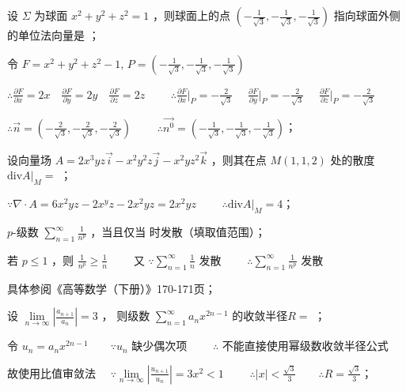 \begin{question}[points = 3]
    设 $\Sigma$ 为球面 $x^2 + y^2 + z^2 = 1$ ，则球面上的点 $\left(-\frac{1}{\sqrt{3}}, -\frac{1}{\sqrt{3}}, -\frac{1}{\sqrt{3}}\right)$
    指向球面外侧的单位法向量是 ；
\end{question}
\begin{solution}
    令 $F = x^2 + y^2 + z^2 - 1, \, P = \left(-\frac{1}{\sqrt{3}}, -\frac{1}{\sqrt{3}}, -\frac{1}{\sqrt{3}}\right)$

    $\therefore \frac{\partial F}{\partial x} = 2x \quad \frac{\partial F}{\partial y} = 2y \quad \frac{\partial F}{\partial z} = 2z \qquad$
    $\therefore \frac{\partial F}{\partial x}|_P = -\frac{2}{\sqrt{3}} \quad$
    $\frac{\partial F}{\partial y}|_P = -\frac{2}{\sqrt{3}} \quad$
    $\frac{\partial F}{\partial z}|_P = -\frac{2}{\sqrt{3}}$

    $\therefore \vec{n} = \left(-\frac{2}{\sqrt{3}}, -\frac{2}{\sqrt{3}}, -\frac{2}{\sqrt{3}}\right) \qquad$
    $\therefore \vec{n^0} = \left(-\frac{1}{\sqrt{3}}, -\frac{1}{\sqrt{3}}, -\frac{1}{\sqrt{3}}\right)$；
\end{solution}

\begin{question}[points = 3]
    设向量场 $A = 2x^3yz\vec{i} - x^2y^2z\vec{j} - x^2yz^2\vec{k}$ ，则其在点 $M(1, 1, 2)$ 处的散度 $\mathrm{div}A|_M = $ \fillin[4]；
\end{question}
\begin{solution}
    $\because \nabla \cdot A = 6x^2yz - 2x^yz - 2x^2yz = 2x^2yz \qquad$
    $\therefore \mathrm{div}A|_M = 4$；
\end{solution}

\begin{question}[points = 3]
    $p$-级数 $\sum\limits_{n = 1}^{\infty} \frac{1}{n^p}$ ，当且仅当 \fillin[{$(0, 1]$}] 时发散（填取值范围）；
\end{question}
\begin{solution}
    若 $p \leq 1$ ，则 $\frac{1}{n^p} \geq \frac{1}{n} \qquad$
    又 $\because \sum\limits_{n = 1}^{\infty} \frac{1}{n}$ 发散 $\qquad \therefore \sum\limits_{n = 1}^{\infty} \frac{1}{n^p}$ 发散

    具体参阅《高等数学（下册）》170-171页；
\end{solution}

\begin{question}[points = 3]
    设 $\lim\limits_{n \to \infty} \left|\frac{a_{n + 1}}{a_n}\right| = 3$ ，
    则级数 $\sum\limits_{n = 1}^{\infty} a_nx^{2n - 1}$ 的收敛半径$R = $ ；
\end{question}
\begin{solution}
    令 $u_n = a_nx^{2n - 1} \qquad \because u_n$ 缺少偶次项 $\qquad \therefore$ 不能直接使用幂级数收敛半径公式

    故使用比值审敛法 $\quad \because \lim\limits_{n \to \infty} \left|\frac{u_{n + 1}}{u_n}\right| = 3x^2 < 1 \qquad$
    $\therefore |x| < \frac{\sqrt{3}}{3} \qquad \therefore R = \frac{\sqrt{3}}{3}$；
\end{solution}


